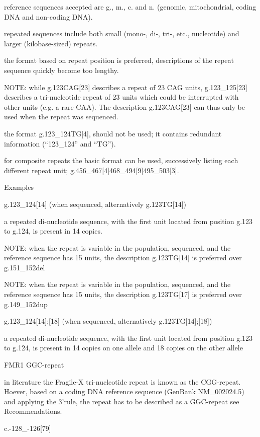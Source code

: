 \documentclass{book}
\begin{document}
	reference sequences accepted are g., m., c. and n. (genomic, mitochondrial, coding DNA and non-coding DNA).

	repeated sequences include both small (mono-, di-, tri-, etc., nucleotide) and larger (kilobase-sized) repeats.

	the format based on repeat position is preferred, descriptions of the repeat sequence quickly become too lengthy. 

	NOTE: while g.123CAG[23] describes a repeat of 23 CAG units, g.123\_125[23] describes a tri-nucleotide repeat of 23 units which could be interrupted with other units (e.g. a rare CAA). The description g.123CAG[23] can thus only be used when the repeat was sequenced.

	the format g.123\_124TG[4], should not be used; it contains redundant information (“123\_124” and “TG”).

	for composite repeats the basic format can be used, successively listing each different repeat unit; g.456\_467[4]468\_494[9]495\_503[3].

	

	

	Examples

	g.123\_124[14] (when sequenced, alternatively g.123TG[14])

	a repeated di-nucleotide sequence, with the first unit located from position g.123 to g.124, is present in 14 copies.

	NOTE: when the repeat is variable in the population, sequenced, and the reference sequence has 15 units, the description g.123TG[14] is preferred over g.151\_152del

	NOTE: when the repeat is variable in the population, sequenced, and the reference sequence has 15 units, the description g.123TG[17] is preferred over g.149\_152dup

	g.123\_124[14];[18] (when sequenced, alternatively g.123TG[14];[18])

	a repeated di-nucleotide sequence, with the first unit located from position g.123 to g.124, is present in 14 copies on one allele and 18 copies on the other allele

	FMR1 GGC-repeat

	in literature the Fragile-X tri-nucleotide repeat is known as the CGG-repeat. Hoever, based on a coding DNA reference sequence (GenBank NM\_002024.5) and applying the 3’rule, the repeat has to be described as a GGC-repeat see Recommendations.

	c.-128\_-126[79]
\end{document}
